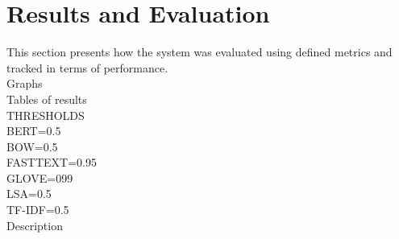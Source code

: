 \documentclass[\myFontSize,oneside,english,hidelinks,a4paper]{article}
\begin{document}
%
%
\section{Results and Evaluation}
This section presents how the system was evaluated using defined metrics and tracked in terms of performance.\\


Graphs\\
Tables of results\\
THRESHOLDS\\
BERT=0.5\\
BOW=0.5\\
FASTTEXT=0.95\\
GLOVE=099\\
LSA=0.5\\
TF-IDF=0.5\\
Description\\\\
\end{document}
